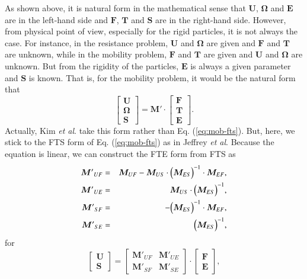 \documentclass{book}
\begin{document}
As shown above, it is natural form in the mathematical sense
that $\bm{U}$, $\bm{\Omega}$ and $\bm{E}$ are in the left-hand side
and $\bm{F}$, $\bm{T}$ and $\bm{S}$ are in the right-hand side.
However, from physical point of view, especially for the rigid particles,
it is not always the case.
For instance, in the resistance problem,
$\bm{U}$ and $\bm{\Omega}$ are given and
$\bm{F}$ and $\bm{T}$ are unknown,
while in the mobility problem,
$\bm{F}$ and $\bm{T}$ are given and
$\bm{U}$ and $\bm{\Omega}$ are unknown.
But from the rigidity of the particles,
$\bm{E}$ is always a given parameter and
$\bm{S}$ is known.
That is, for the mobility problem, it would be the natural form that
\begin{equation}
  \left[
    \begin{array}{c}
      \bm{U}\\
      \bm{\Omega}\\
      \bm{S}
    \end{array}
  \right]
  =
  \bm{M}'
  \cdot
  \left[
    \begin{array}{c}
      \bm{F}\\
      \bm{T}\\
      \bm{E}
    \end{array}
  \right]
  .
\end{equation}
Actually, Kim {\it et al}. take this form
rather than Eq. (\ref{eq:mob-fts}).
But, here, we stick to the FTS form of Eq. (\ref{eq:mob-fts})
as in Jeffrey {\it et al}.
Because the equation is linear,
we can construct the FTE form from FTS as
\begin{eqnarray}
  {\bm{M}'}_{UF}
  &=&
  \bm{M}_{UF}
  -
  \bm{M}_{US}
  \cdot
  \Bigl(
  \bm{M}_{ES}
  \Bigr)^{-1}
  \cdot
  \bm{M}_{EF}
  ,\\
  {\bm{M}'}_{UE}
  &=&
  \bm{M}_{US}
  \cdot
  \Bigl(
    \bm{M}_{ES}
  \Bigr)^{-1}
  ,\\
  {\bm{M}'}_{SF}
  &=&
  -
  \Bigl(
    \bm{M}_{ES}
  \Bigr)^{-1}
  \cdot
  \bm{M}_{EF}
  ,\\
  {\bm{M}'}_{SE}
  &=&
  \Bigl(
    \bm{M}_{ES}
  \Bigr)^{-1}
  ,
\end{eqnarray}
for
\begin{equation}
  \left[
    \begin{array}{c}
      \bm{U}\\
      \bm{S}
    \end{array}
  \right]
  =
  \left[
    \begin{array}{cc}
      {\bm{M}'}_{UF} & {\bm{M}'}_{UE}\\
      {\bm{M}'}_{SF} & {\bm{M}'}_{SE}
    \end{array}
  \right]
  \cdot
  \left[
    \begin{array}{c}
      \bm{F}\\
      \bm{E}
    \end{array}
  \right]
  ,
\end{equation}
\end{document}
